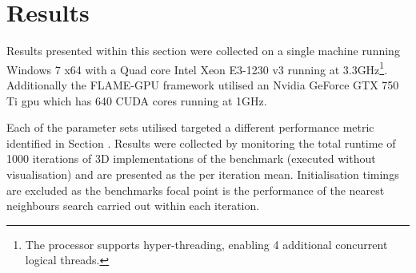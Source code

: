 \section{Results\label{sec:results}}
\vspace{-0.5cm}
  Results presented within this section were collected on a single machine running Windows 7 x64 with a Quad core Intel Xeon E3-1230 v3 running at 3.3GHz\footnote{The processor supports hyper-threading, enabling 4 additional concurrent logical threads.}. Additionally the FLAME-GPU framework utilised an Nvidia GeForce GTX 750 Ti \gls{gpu} which has 640 CUDA cores running at 1GHz.
  
  Each of the parameter sets utilised targeted a different performance metric identified in Section \label{sec:benchmark-model}. Results were collected by monitoring the total runtime of 1000 iterations of 3D implementations of the benchmark (executed without visualisation) and are presented as the per iteration mean. Initialisation timings are excluded as the benchmarks focal point is the performance of the nearest neighbours search carried out within each iteration.

